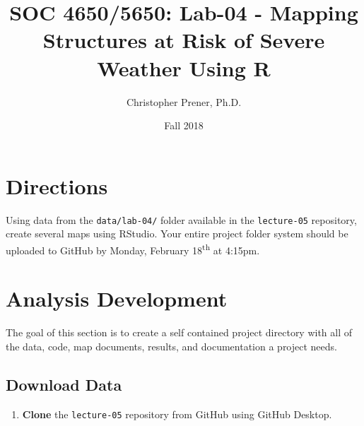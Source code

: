 \documentclass{tufte-handout}
\title{SOC 4650/5650: Lab-04 - Mapping Structures at Risk of Severe Weather Using R}
\author{Christopher Prener, Ph.D.}
\date{Fall 2018}
\begin{document}
\maketitle %

\section{Directions}
Using data from the \texttt{data/lab-04/} folder available in the \texttt{lecture-05} repository, create several maps using RStudio. Your entire project folder system should be uploaded to GitHub by Monday, February 18\textsuperscript{th} at 4:15pm.

\vspace{5mm}
\section{Analysis Development}
The goal of this section is to create a self contained project directory with all of the data, code, map documents, results, and documentation a project needs.

\vspace{3mm}
\subsection{Download Data}
\begin{enumerate}[label=\alph*.]
\item \textbf{Clone} the \texttt{lecture-05} repository from GitHub using GitHub Desktop.
\end{enumerate}

\vspace{3mm}
\end{document}

